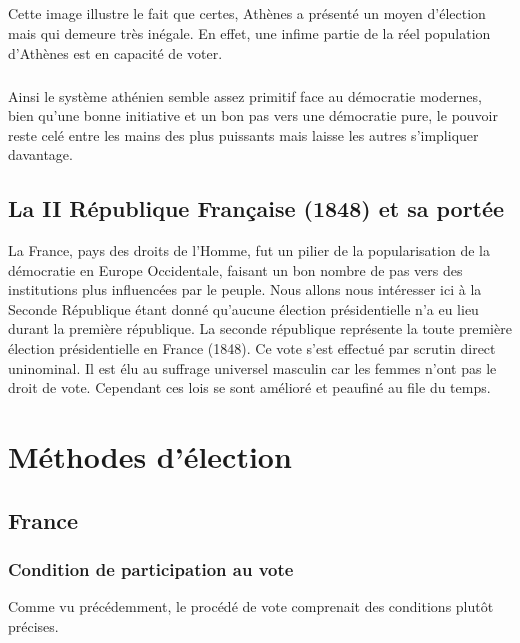 \documentclass[11pt,a4paper]{report}
\begin{document}
\paragraph{}
Cette image illustre le fait que certes, Athènes a présenté un moyen d'élection mais qui demeure très inégale. 
En effet, une infime partie de la réel population d'Athènes est en capacité de voter.

\paragraph{} 
Ainsi le système athénien semble assez primitif face au démocratie modernes, bien qu'une bonne initiative et un bon pas vers une démocratie pure, le pouvoir reste celé entre les mains des plus puissants mais laisse les autres s'impliquer davantage.

\section{La II République Française (1848) et sa portée}
La France, pays des droits de l’Homme, fut un pilier de la popularisation de la démocratie en Europe Occidentale, faisant un bon nombre de pas vers des institutions plus influencées par le peuple.
Nous allons nous intéresser ici à la Seconde République étant donné qu’aucune élection présidentielle n'a eu lieu durant la première république\nocite{wiki:deuxiemerep}.
La seconde république représente la toute première élection présidentielle en France (1848)\nocite{wiki:1848}.
Ce vote s'est effectué par scrutin direct uninominal.
Il est élu au suffrage universel masculin car les femmes n’ont pas le droit de vote. Cependant ces lois se sont amélioré et peaufiné au file du temps. \nocite{wiki:premiererep}

\chapter{Méthodes d'élection}
\section{France} %
\subsection{Condition de participation au vote}

Comme vu précédemment, le procédé de vote comprenait des conditions plutôt précises.
\end{document}
